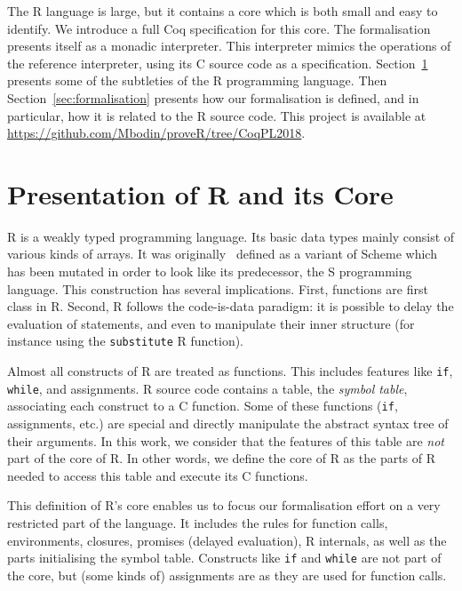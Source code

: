 \documentclass[9pt, sigplan, natbib=false, screen=true]{acmart}
\newcommand\Coq{Coq}
\newcommand\R{R}
\newcommand\Cn{C}
\begin{document}
The \R{} language is large,
but it contains a core which is both small and easy to identify.
We introduce a full \Coq{} specification for this core.
The formalisation presents itself as a monadic interpreter.
This interpreter mimics the operations of the reference interpreter,
using its \Cn{} source code as a specification.
%
Section~\ref{sec:presentation} presents some of the subtleties of the \R{} programming language.
Then Section~\ref{sec:formalisation} presents how our formalisation is defined,
and in particular, how it is related to the \R{} source code.
This project is available at \url{https://github.com/Mbodin/proveR/tree/CoqPL2018}.


\section{Presentation of \R{} and its Core}
\label{sec:presentation}

\R{} is a weakly typed programming language.
Its basic data types mainly consist of various kinds of arrays.
It was originally~\parencite{ihaka1996r} defined as a variant of Scheme
which has been mutated in order to look like its predecessor,
the S programming language.
This construction has several implications.
First, functions are first class in \R{}.
Second, \R{} follows the code-is-data paradigm:
it is possible to delay the evaluation of statements,
and even to manipulate their inner structure
(for instance using the \texttt{substitute} \R{} function).

Almost all constructs of \R{} are treated as functions.
This includes features like \texttt{if}, \texttt{while},
and assignments.
\R{} source code contains a table,
the \emph{symbol table},
associating each construct to a \Cn{} function.
Some of these functions (\texttt{if}, assignments, etc.)
are special and directly manipulate the abstract syntax tree
of their arguments.
%
In this work,
we consider that the features of this table
are \emph{not} part of the core of \R{}.
In other words, we define the core of \R{}
as the parts of \R{} needed to access this table
and execute its \Cn{} functions.

This definition of \R{}'s core enables us to focus
our formalisation effort on a very restricted part of the language.
It includes the rules for function calls,
environments, closures, promises (delayed evaluation), \R{} internals,
as well as the parts initialising the symbol table.
Constructs like \texttt{if} and \texttt{while}
are not part of the core,
but (some kinds of) assignments are
as they are used for function calls.
\end{document}
